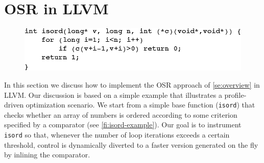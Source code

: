 
\section{OSR in LLVM}
\label{se:osr-llvm}


\ifdefined\noauthorea
\begin{figure}[t]
\begin{center}
\includegraphics[width=0.9\columnwidth]{figures/isord-example/isord.eps}
\caption{\protect}
\end{center}
\end{figure}
\fi

In this section we discuss how to implement the OSR approach of \mysection\ref{se:overview} in LLVM. Our discussion is based on a simple example that illustrates a profile-driven optimization scenario. We start from a simple base function ({\tt isord}) that checks whether an array of numbers is ordered according to some criterion specified by a comparator (see \myfigure\ref{fi:isord-example}). Our goal is to instrument {\tt isord} so that, whenever the number of loop iterations exceeds a certain threshold, control is dynamically diverted to a faster version generated on the fly by inlining the comparator. 

